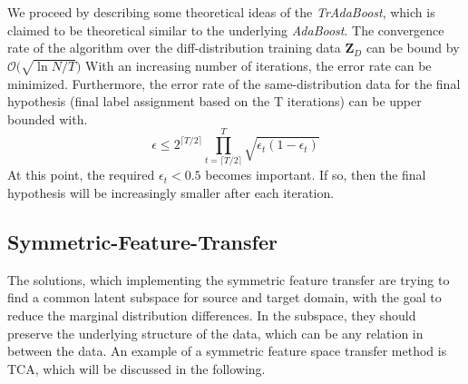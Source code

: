 We proceed by describing some theoretical ideas of the \textit{TrAdaBoost}, which is claimed to be theoretical similar to the underlying \textit{AdaBoost}.
The convergence rate of the algorithm over the diff-distribution training data $\mathbf{Z}_D$ can be bound by $\mathcal{O}\big(\sqrt{\ln N /T }\big)$
With an increasing number of iterations, the error rate can be minimized.
Furthermore, the error rate of the same-distribution data for the final hypothesis (final label assignment based on the T iterations) can be upper bounded with.
\begin{equation}
	\epsilon \le 2^{\lceil T / 2\rceil} \prod_{t=\lceil T / 2\rceil}^{T} \sqrt{\epsilon_t(1-\epsilon_t)}
\end{equation}
At this point, the required $\epsilon_t < 0.5$ becomes important.
If so, then the final hypothesis will be increasingly smaller after each iteration.\cite{Dai.}

\subsection{Symmetric-Feature-Transfer}\label{TlSubSecHomoSymFeature}
The solutions, which implementing the symmetric feature transfer are trying to find a common latent subspace for source and target domain, with the goal to reduce the marginal distribution differences.
In the subspace, they should preserve the underlying structure of the data, which can be any relation in between the data.
An example of a symmetric feature space transfer method is \ac{TCA}, which will be discussed in the following.\cite[p. 6]{Weiss.2016}
